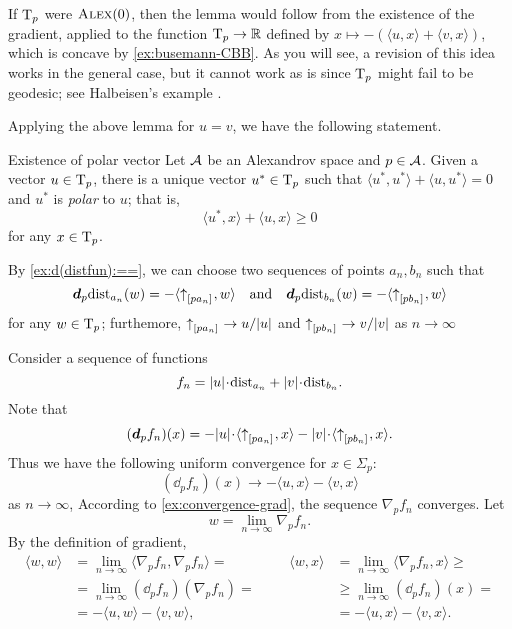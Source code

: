If $\mathrm{T}_p$ were $\textsc{Alex}(0)$, then the lemma would follow from the existence  of the gradient, applied to the function $\mathrm{T}_p\to \mathbb{R}$ defined by $x\mapsto -(\langle u,x\rangle +\langle v,x\rangle )$, which is concave by \ref{ex:busemann-CBB}.
As you will see, a revision of this idea works in the general case, but it cannot work as is since $\mathrm{T}_p$ might fail to be geodesic; see  Halbeisen's example \cite{alexander-kapovitch-petrunin2024}.

Applying the above lemma for $u=v$, we have the following statement.

\begin{thm}{Existence of polar vector}\label{cor:polar}
Let $\mathcal{A}$ be an Alexandrov space 
and $p\in \mathcal{A}$. 
Given a vector $u\in \mathrm{T}_p$,  there is a unique vector $u^*\in\mathrm{T}_p$ such that $\langle u^*,u^*\rangle +\langle u,u^*\rangle = 0$ and
$u^*$ is \emph{polar} to $u$;
that is,
\[\langle u^*,x\rangle +\langle u,x\rangle \ge 0\]
for any $x\in \mathrm{T}_p$.
\end{thm}

By \ref{ex:d(distfun):==}, we can choose two sequences of points $a_n,b_n$ such that 
\[
\bm{d}_p\mathrm{dist}_{a_n}(w)=-\langle{\uparrow}_{[{p}{a_n}]_{{}}},w\rangle
\quad\text{and}\quad
\bm{d}_p\mathrm{dist}_{b_n}(w)=-\langle{\uparrow}_{[{p}{b_n}]_{{}}},w\rangle
\]
for any $w\in\mathrm{T}_p$; furthemore, ${\uparrow}_{[{p}{a_n}]_{{}}}\to u/|u|$ and ${\uparrow}_{[{p}{b_n}]_{{}}}\to v/|v|$ as $n\to \infty$

Consider a sequence of functions 
\[f_n=|u|\cdot\distfun_{a_n}+|v|\cdot\distfun_{b_n}.\]
Note that 
\[(\dd_pf_n)(x)=-|u|\cdot\langle \dir{p}{a_n},x\rangle -|v|\cdot\langle \dir{p}{b_n},x\rangle .\]
Thus we have the following uniform convergence for $x\in\Sigma_p$:
\[(\dd_pf_n)(x)\to-\langle u,x\rangle -\langle v,x\rangle \]
as $n\to\infty$,
According to \ref{ex:convergence-grad}, 
the sequence $\nabla_pf_n$ converges.
Let 
\[w=\lim_{n\to\infty}\nabla_pf_n.\]
By the definition of gradient,
\[\begin{aligned}
\langle w,w\rangle &=\lim_{n\to\infty}\langle \nabla_pf_n,\nabla_pf_n\rangle =
&&&%
\langle w,x\rangle &=\lim_{n\to\infty}\langle \nabla_pf_n,x\rangle \ge
\\%
&=\lim_{n\to\infty}(\dd_p f_n)(\nabla_p f_n)
=
&&&%
&\ge
\lim_{n\to\infty}(\dd_pf_n)(x)
=
\\%
&=-\langle u,w\rangle -\langle v,w\rangle ,
&&&%
&=-\langle u,x\rangle -\langle v,x\rangle .
\end{aligned}\]

